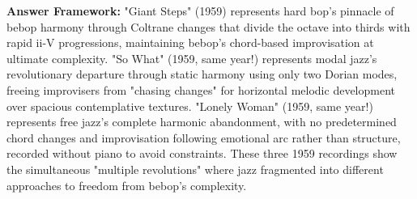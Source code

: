 \documentclass[11pt]{article}
\begin{document}
\textbf{Answer Framework:} "Giant Steps" (1959) represents hard bop's pinnacle of bebop harmony through Coltrane changes that divide the octave into thirds with rapid ii-V progressions, maintaining bebop's chord-based improvisation at ultimate complexity. "So What" (1959, same year!) represents modal jazz's revolutionary departure through static harmony using only two Dorian modes, freeing improvisers from "chasing changes" for horizontal melodic development over spacious contemplative textures. "Lonely Woman" (1959, same year!) represents free jazz's complete harmonic abandonment, with no predetermined chord changes and improvisation following emotional arc rather than structure, recorded without piano to avoid constraints. These three 1959 recordings show the simultaneous "multiple revolutions" where jazz fragmented into different approaches to freedom from bebop's complexity.
\end{document}
